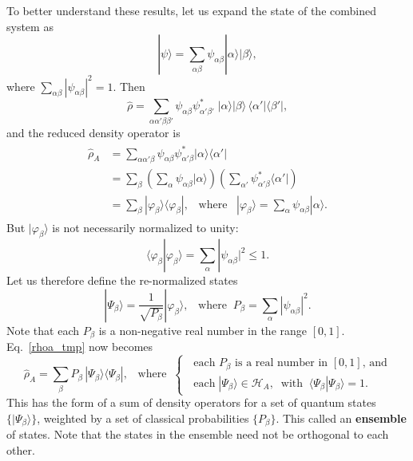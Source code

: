 \documentclass[pra,12pt]{revtex4-2}
\begin{document}
To better understand these results, let us expand the state of the
combined system as
\begin{equation}
  |\psi\rangle = \sum_{\alpha\beta} \psi_{\alpha\beta} |\alpha\rangle |\beta\rangle,
\end{equation}
where $\sum_{\alpha\beta} |\psi_{\alpha\beta}|^2 = 1$.  Then
\begin{equation}
  \hat{\rho} = \sum_{\alpha\alpha'\beta\beta'} \psi_{\alpha\beta}
  \psi_{\alpha'\beta'}^* \; |\alpha\rangle |\beta\rangle \,
  \langle\alpha'|\langle \beta'|,
\end{equation}
and the reduced density operator is
\begin{align}
  \begin{aligned}
    \hat{\rho}_A &= \sum_{\alpha\alpha'\beta} \psi_{\alpha\beta}\psi_{\alpha'\beta}^* |\alpha\rangle
    \langle\alpha'| \\
    &= \sum_\beta \left(\sum_\alpha \psi_{\alpha\beta} |\alpha\rangle\right)
    \left(\sum_{\alpha'} \psi_{\alpha'\beta}^*\langle\alpha'|\right) \\
    &= \sum_\beta |\varphi_\beta\rangle \langle \varphi_\beta|,
    \;\;\;\mathrm{where}\;\;\;
    |\varphi_\beta\rangle = \sum_\alpha \psi_{\alpha\beta} |\alpha\rangle.
  \end{aligned}
  \label{rhoa_tmp}
\end{align}
But $|\varphi_\beta\rangle$ is not necessarily normalized to unity:
\begin{equation}
  \langle \varphi_\beta | \varphi_\beta\rangle =
  \sum_{\alpha}|\psi_{\alpha\beta}|^2 \le 1.
\end{equation}
Let us therefore define the re-normalized states
\begin{equation}
  |\Psi_\beta\rangle = \frac{1}{\sqrt{P_\beta}} |\varphi_\beta\rangle,
  \;\;\;\mathrm{where} \;\; P_\beta = \sum_{\alpha}|\psi_{\alpha\beta}|^2.
\end{equation}
Note that each $P_\beta$ is a non-negative real number in the range
$[0,1]$.  Eq.~\eqref{rhoa_tmp} now becomes
\begin{equation}
  \hat{\rho}_A = \sum_\beta P_\beta\, |\Psi_\beta\rangle
  \langle \Psi_\beta|,
  \;\;\;\mathrm{where}\;\;
  \begin{cases}
    \;\;\textrm{each $P_\beta$ is a real number in $[0,1]$, and} \\
    \;\;\textrm{each}\; |\Psi_\beta\rangle \in \mathscr{H}_A,
    \;\;\mathrm{with}
    \;\;\langle\Psi_\beta|\Psi_\beta\rangle = 1.
  \end{cases}
  \label{rhoform}
\end{equation}
This has the form of a sum of density operators for a set of quantum
states $\{|\Psi_\beta\rangle\}$, weighted by a set of classical
probabilities $\{P_\beta\}$.  This called an \textbf{ensemble} of
states.  Note that the states in the ensemble need not be orthogonal
to each other.
\end{document}
